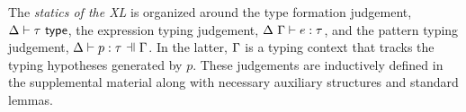 \documentclass[acmsmall,review,anonymous]{acmart}\settopmatter{printfolios=true,printccs=false,printacmref=false}
\begin{document}
The \emph{statics of the XL} is organized around the type formation judgement, $\Delta \vdash \tau~\mathsf{type}$, the expression typing judgement, $\Delta~\Gamma \vdash e : \tau$, and the pattern typing judgement, $\patType{\pctx}{p}{\tau}$. In the latter, $\Gamma$ is a typing context that tracks the typing hypotheses generated by $p$. These judgements are inductively defined in the supplemental material along with necessary auxiliary structures and  standard lemmas. %
\end{document}
